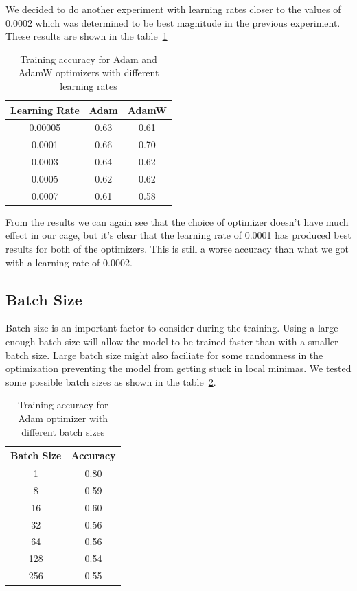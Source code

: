 \documentclass[12pt,a4paper,english
]{tunithesis}
\begin{document}
We decided to do another experiment with learning rates closer to the values of $0.0002$ which was determined to be best magnitude in the previous experiment. These results are shown in the table~\ref{tab:learningrates2}

\begin{table}[h!]
\centering
\caption{Training accuracy for Adam and AdamW optimizers with different learning rates}
\begin{tabular}{|c|c|c|}
\hline
\textbf{Learning Rate} & \textbf{Adam} & \textbf{AdamW} \\ \hline
0.00005 & 0.63 & 0.61 \\ \hline
0.0001 & 0.66 & 0.70 \\ \hline
0.0003 & 0.64 & 0.62 \\ \hline
0.0005 & 0.62 & 0.62 \\ \hline
0.0007 & 0.61 & 0.58 \\ \hline
\end{tabular}
\label{tab:learningrates2}
\end{table}

From the results we can again see that the choice of optimizer doesn't have much effect in our cage, but it's clear that the learning rate of 0.0001 has produced best results for both of the optimizers. This is still a worse accuracy than what we got with a learning rate of 0.0002.

\subsection{Batch Size}
Batch size is an important factor to consider during the training. Using a large enough batch size will allow the model to be trained faster than with a smaller batch size. Large batch size might also faciliate for some randomness in the optimization preventing the model from getting stuck in local minimas. We tested some possible batch sizes as shown in the table~\ref{tab:batchsizes}.
\begin{table}[h!]
\centering
\caption{Training accuracy for Adam optimizer with different batch sizes}
\begin{tabular}{|c|c|}
\hline
\textbf{Batch Size} & \textbf{Accuracy} \\ \hline
1 & 0.80 \\ \hline
8 & 0.59 \\ \hline
16 & 0.60 \\ \hline
32 & 0.56 \\ \hline
64 & 0.56 \\ \hline
128 & 0.54 \\ \hline
256 & 0.55 \\ \hline
\end{tabular}
\label{tab:batchsizes}
\end{table}
\end{document}

